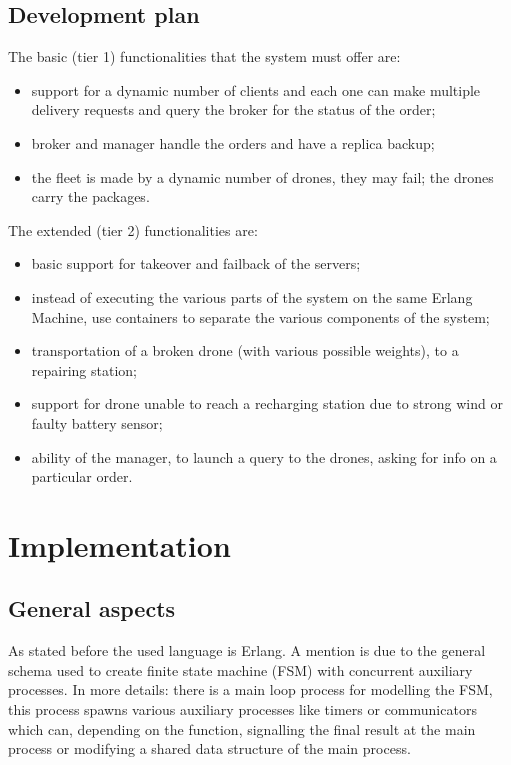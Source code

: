 \documentclass[a4paper, oneside]{memoir}
\begin{document}
\section{Development plan}
\label{Development-plan}
The basic (tier 1) functionalities that the system must offer are:
\begin{itemize}
\item support for a dynamic number of clients and each one can make multiple delivery requests and query the broker for the status of the order;
\item broker and manager handle the orders and have a replica backup;
\item the fleet is made by a dynamic number of drones, they may fail; the drones carry the packages.
\end{itemize}

The extended (tier 2) functionalities are:
\begin{itemize}
\item basic support for takeover and failback of the servers;
\item instead of executing the various parts of the system on the same Erlang Machine, use containers to separate the various components of the system;
\item transportation of a broken drone (with various possible weights), to a repairing station;
\item support for drone unable to reach a recharging station due to strong wind or faulty battery sensor;
\item ability of the manager, to launch a query to the drones, asking for info on a particular order.
\end{itemize}


\chapter{Implementation}

\section{General aspects}
As stated before the used language is Erlang. A mention is due to the general schema used to create finite state machine (FSM) with concurrent auxiliary processes.
In more details: there is a main loop process for modelling the FSM, this process spawns various auxiliary processes like timers or communicators which can, depending on the function, signalling the final result at the main process or modifying a shared data structure of the main process.
\end{document}
